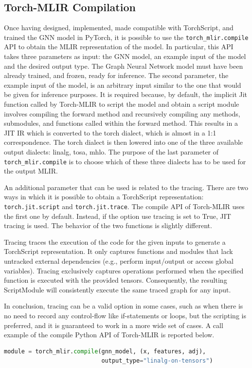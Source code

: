 \subsection{Torch-MLIR Compilation}
\label{subsec:torch-mlir-compilation}%

Once having designed, implemented, made compatible with TorchScript, and trained the GNN model in PyTorch, it is possible to use the \lstinline{torch_mlir.compile} API to obtain the MLIR representation of the model.
In particular, this API takes three parameters as input: the GNN model, an example input of the model and the desired output type.
The Graph Neural Network model must have been already trained, and frozen, ready for inference.
The second parameter, the example input of the model, is an arbitrary input similar to the one that would be given for inference purposes.
It is required because, by default, the implicit Jit function called by Torch-MLIR to script the model and obtain a script module involves compiling the forward method and recursively compiling any methods, submodules, and functions called within the forward method.
This results in a JIT IR which is converted to the torch dialect, which is almost in a 1:1 correspondence.
The torch dialect is then lowered into one of the three available output dialects: linalg, tosa, mhlo.
The purpose of the last parameter of \lstinline{torch_mlir.compile} is to choose which of these three dialects has to be used for the output MLIR\@.

An additional parameter that can be used is related to the tracing.
There are two ways in which it is possible to obtain a TorchScript representation: \lstinline{torch.jit.script} and \lstinline{torch.jit.trace}.
The compile API of Torch-MLIR uses the first one by default.
Instead, if the option use tracing is set to True, JIT tracing is used.
The behavior of the two functions is slightly different.

Tracing traces the execution of the code for the given inputs to generate a TorchScript representation.
It only captures functions and modules that lack untracked external dependencies (e.g., perform input/output or access global variables).
Tracing exclusively captures operations performed when the specified function is executed with the provided tensors.
Consequently, the resulting ScriptModule will consistently execute the same traced graph for any input.

In conclusion, tracing can be a valid option in some cases, such as when there is no need to record any control-flow like if-statements or loops, but the scripting is preferred, and it is guaranteed to work in a more wide set of cases.
A call example of the compile Python API of Torch-MLIR is reported below.
\begin{lstlisting}[language=Python,label={lst:torch_mlir-compile}]
module = torch_mlir.compile(gnn_model, (x, features, adj),
                            output_type="linalg-on-tensors")
\end{lstlisting}

